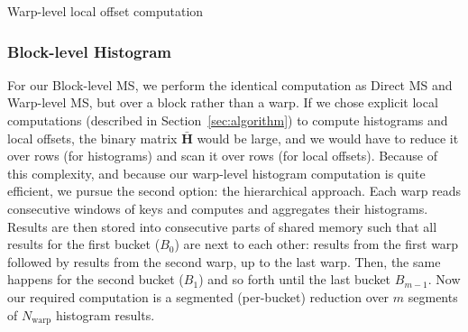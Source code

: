 \begin{algorithm}
\DontPrintSemicolon
\caption{Warp-level local offset computation}\label{alg:warp_offsets}
\end{algorithm}

\subsubsection{Block-level Histogram}\label{subsubsec:block_histogram}
For our Block-level MS, we perform the identical computation as Direct MS and Warp-level MS, but over a block rather than a warp. If we chose explicit local computations (described in Section~\ref{sec:algorithm}) to compute histograms and local offsets, the binary matrix $\bar{\mathbf{H}}$ would be large, and we would have to reduce it over rows (for histograms) and scan it over rows (for local offsets). Because of this complexity, and because our warp-level histogram computation is quite efficient, we pursue the second option: the hierarchical approach.
Each warp reads consecutive windows of keys and computes and aggregates their histograms.
Results are then stored into consecutive parts of shared memory such that all results for the first bucket ($B_0$) are next to each other: results from the first warp followed by results from the second warp, up to the last warp. Then, the same happens for the second bucket ($B_1$) and so forth until the last bucket $B_{m-1}$.
Now our required computation is a segmented (per-bucket) reduction over $m$ segments of $N_\text{warp}$ histogram results.

